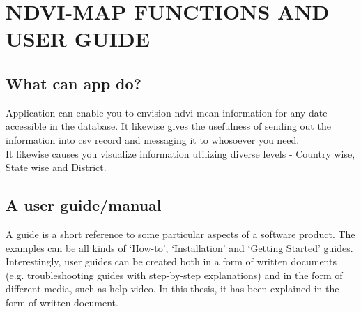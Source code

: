 \chapter{NDVI-MAP FUNCTIONS AND USER GUIDE}
\label{chap:ndvi & it's user guide}

\section{What can app do?}

Application can enable you to envision \gls{ndvi} mean information for any date accessible in the database. It likewise gives the usefulness of sending out the information into \gls{csv} record and messaging it to whosoever you need. \\
It likewise causes you visualize information utilizing diverse levels - Country wise, State wise and District.

\section{A user guide/manual}

A guide is a short reference to some particular aspects of a software product. The examples can be all kinds of ‘How-to’, ‘Installation’ and ‘Getting Started’ guides. Interestingly, user guides can be created both in a form of written documents (e.g. troubleshooting guides with step-by-step explanations) and in the form of different media, such as help video. In this thesis, it has been explained in the form of written document.


